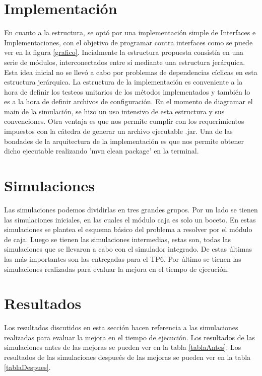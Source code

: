 \documentclass{article}
\begin{document}
\section{Implementación}
En cuanto a la estructura, se optó por una implementación simple de Interfaces e Implementaciones, con el objetivo de programar contra interfaces como se puede ver en la figura \ref{grafico}. Incialmente la estructura propuesta consistía en una serie de módulos,
interconectados entre sí mediante una estructura jerárquica. Esta idea inicial no se llevó a cabo por problemas de dependencias cíclicas en esta estructura jerárquica. La estructura de la implementación es conveniente a la hora de definir los testeos unitarios de los métodos implementados y también lo es a la hora de definir archivos de configuración. En el momento de diagramar el main de la simulación, se hizo un uso intensivo de esta estructura y sus convenciones. Otra ventaja es que nos permite cumplir con los requerimientos impuestos con la cátedra de generar un archivo ejecutable .jar. Una de las bondades de la arquitectura de la implementación es que nos permite obtener dicho ejecutable realizando 'mvn clean package' en la terminal.



\section{Simulaciones}
Las simulaciones podemos dividirlas en tres grandes grupos. Por un lado se tienen las simulaciones iniciales, en las cuales el módulo caja es solo un boceto. En estas simulaciones se plantea el esquema básico del problema a resolver por el módulo de caja.
Luego se tienen las simulaciones intermedias, estas son, todas las simulaciones que se llevaron a cabo con el simulador integrado. De estas últimas las más importantes son las entregadas para el TP6. Por último se tienen las simulaciones realizadas para evaluar
la mejora en el tiempo de ejecución.

\section{Resultados}
Los resultados discutidos en esta sección hacen referencia a las simulaciones realizadas para evaluar la mejora en el tiempo de ejecución.
Los resultados de las simulaciones antes de las mejoras se pueden ver en la tabla \ref{tablaAntes}.
Los resultados de las simulaciones despue\'es de las mejoras se pueden ver en la tabla \ref{tablaDespues}.
\end{document}
